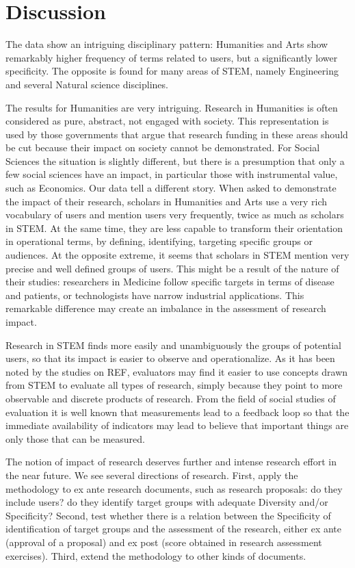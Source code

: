 \documentclass[b5paper,]{book}
\theoremstyle{definition}
\theoremstyle{definition}
\theoremstyle{definition}
\theoremstyle{remark}
\begin{document}
\section{Discussion}\label{discussion-1}

The data show an intriguing disciplinary pattern: Humanities and Arts
show remarkably higher frequency of terms related to users, but a
significantly lower specificity. The opposite is found for many areas of
STEM, namely Engineering and several Natural science disciplines.

The results for Humanities are very intriguing. Research in Humanities
is often considered as pure, abstract, not engaged with society. This
representation is used by those governments that argue that research
funding in these areas should be cut because their impact on society
cannot be demonstrated. For Social Sciences the situation is slightly
different, but there is a presumption that only a few social sciences
have an impact, in particular those with instrumental value, such as
Economics. Our data tell a different story. When asked to demonstrate
the impact of their research, scholars in Humanities and Arts use a very
rich vocabulary of users and mention users very frequently, twice as
much as scholars in STEM. At the same time, they are less capable to
transform their orientation in operational terms, by defining,
identifying, targeting specific groups or audiences. At the opposite
extreme, it seems that scholars in STEM mention very precise and well
defined groups of users. This might be a result of the nature of their
studies: researchers in Medicine follow specific targets in terms of
disease and patients, or technologists have narrow industrial
applications. This remarkable difference may create an imbalance in the
assessment of research impact.

Research in STEM finds more easily and unambiguously the groups of
potential users, so that its impact is easier to observe and
operationalize. As it has been noted by the studies on REF, evaluators
may find it easier to use concepts drawn from STEM to evaluate all types
of research, simply because they point to more observable and discrete
products of research. From the field of social studies of evaluation it
is well known that measurements lead to a feedback loop so that the
immediate availability of indicators may lead to believe that important
things are only those that can be measured.

The notion of impact of research deserves further and intense research
effort in the near future. We see several directions of research. First,
apply the methodology to ex ante research documents, such as research
proposals: do they include users? do they identify target groups with
adequate Diversity and/or Specificity? Second, test whether there is a
relation between the Specificity of identification of target groups and
the assessment of the research, either ex ante (approval of a proposal)
and ex post (score obtained in research assessment exercises). Third,
extend the methodology to other kinds of documents.
\end{document}
